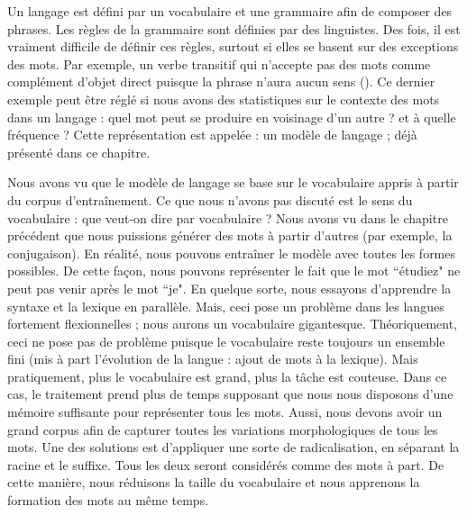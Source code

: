 \documentclass{KodeBook}
\begin{document}

Un langage est défini par un vocabulaire et une grammaire afin de composer des phrases. 
Les règles de la grammaire sont définies par des linguistes. 
Des fois, il est vraiment difficile de définir ces règles, surtout si elles se basent sur des exceptions des mots. 
Par exemple, un verbe transitif qui n'accepte pas des mots comme complément d'objet direct puisque la phrase n'aura aucun sens (). 
Ce dernier exemple peut être réglé si nous avons des statistiques sur le contexte des mots dans un langage : quel mot peut se produire en voisinage d'un autre ? et à quelle fréquence ?
Cette représentation est appelée : un modèle de langage ; déjà présenté dans ce chapitre. 

Nous avons vu que le modèle de langage se base sur le vocabulaire appris à partir du corpus d'entraînement. 
Ce que nous n'avons pas discuté est le sens du vocabulaire : que veut-on dire par vocabulaire ?
Nous avons vu dans le chapitre précédent que nous puissions générer des mots à partir d'autres (par exemple, la conjugaison).
En réalité, nous pouvons entraîner le modèle avec toutes les formes possibles. 
De cette façon, nous pouvons représenter le fait que le mot ``étudiez" ne peut pas venir après le mot ``je".
En quelque sorte, nous essayons d'apprendre la syntaxe et la lexique en parallèle. 
Mais, ceci pose un problème dans les langues fortement flexionnelles ; nous aurons un vocabulaire gigantesque.
Théoriquement, ceci ne pose pas de problème puisque le vocabulaire reste toujours un ensemble fini (mis à part l'évolution de la langue : ajout de mots à la lexique). 
Mais pratiquement, plus le vocabulaire est grand, plus la tâche est couteuse. 
Dans ce cas, le traitement prend plus de temps supposant que nous nous disposons d'une mémoire suffisante pour représenter tous les mots. 
Aussi, nous devons avoir un grand corpus afin de capturer toutes les variations morphologiques de tous les mots. 
Une des solutions est d'appliquer une sorte de radicalisation, en séparant la racine et le suffixe. 
Tous les deux seront considérés comme des mots à part. 
De cette manière, nous réduisons la taille  du vocabulaire et nous apprenons la formation des mots au même temps. 
\end{document}
